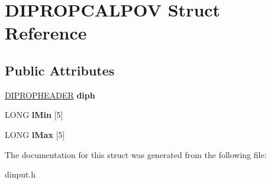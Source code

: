\hypertarget{struct_d_i_p_r_o_p_c_a_l_p_o_v}{\section{D\-I\-P\-R\-O\-P\-C\-A\-L\-P\-O\-V Struct Reference}
\label{struct_d_i_p_r_o_p_c_a_l_p_o_v}
}
\subsection*{Public Attributes}
\begin{DoxyCompactItemize}
\item 
\hypertarget{struct_d_i_p_r_o_p_c_a_l_p_o_v_ad78c67313e32215c0cc925d89377d10f}{\hyperlink{struct_d_i_p_r_o_p_h_e_a_d_e_r}{D\-I\-P\-R\-O\-P\-H\-E\-A\-D\-E\-R} {\bfseries diph}}\label{struct_d_i_p_r_o_p_c_a_l_p_o_v_ad78c67313e32215c0cc925d89377d10f}

\item 
\hypertarget{struct_d_i_p_r_o_p_c_a_l_p_o_v_a8ae14fca6ada4558975e637755716e57}{L\-O\-N\-G {\bfseries l\-Min} \mbox{[}5\mbox{]}}\label{struct_d_i_p_r_o_p_c_a_l_p_o_v_a8ae14fca6ada4558975e637755716e57}

\item 
\hypertarget{struct_d_i_p_r_o_p_c_a_l_p_o_v_a6e3c5e10ce041f40bb10d8051b9a9cb6}{L\-O\-N\-G {\bfseries l\-Max} \mbox{[}5\mbox{]}}\label{struct_d_i_p_r_o_p_c_a_l_p_o_v_a6e3c5e10ce041f40bb10d8051b9a9cb6}

\end{DoxyCompactItemize}


The documentation for this struct was generated from the following file\-:\begin{DoxyCompactItemize}
\item 
dinput.\-h\end{DoxyCompactItemize}
